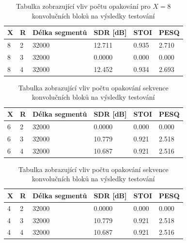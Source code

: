\begin{table}[hbt]
\centering
\caption{Tabulka zobrazující vliv počtu opakování pro $X=8$ konvolučních bloků na výsledky testování}
\label{tab:vliv-X8}
\begin{tabular}{|l|l|l|l|l|l|}
\hline
\textbf{X} & \textbf{R} & \textbf{Délka segmentů} & \textbf{SDR {[}dB{]}} & \textbf{STOI} & \textbf{PESQ} \\ \hline
8 & 2 & 32000 & 12.711 & 0.935 & 2.710 \\ \hline
8 & 3 & 32000 & 0.0000 & 0.000 & 0.000 \\ \hline
8 & 4 & 32000 & 12.452 & 0.934 & 2.693 \\ \hline
\end{tabular}
\end{table}


\begin{table}[hbt]
\centering
\caption{Tabulka zobrazující vliv počtu opakování sekvence konvolučních bloků na výsledky testování}
\label{tab:vliv-X6}
\begin{tabular}{|l|l|l|l|l|l|}
\hline
\textbf{X} & \textbf{R} & \textbf{Délka segmentů} & \textbf{SDR {[}dB{]}} & \textbf{STOI} & \textbf{PESQ} \\ \hline
6 & 2 & 32000 & 0.0000 & 0.000 & 0.000 \\ \hline
6 & 3 & 32000 & 10.779 & 0.921 & 2.518 \\ \hline
6 & 4 & 32000 & 10.687 & 0.921 & 2.516 \\ \hline
\end{tabular}
\end{table}


\begin{table}[hbt]
\centering
\caption{Tabulka zobrazující vliv počtu opakování sekvence konvolučních bloků na výsledky testování}
\label{tab:vliv-X4}
\begin{tabular}{|l|l|l|l|l|l|}
\hline
\textbf{X} & \textbf{R} & \textbf{Délka segmentů} & \textbf{SDR {[}dB{]}} & \textbf{STOI} & \textbf{PESQ} \\ \hline
4 & 2 & 32000 & 0.0000 & 0.000 & 0.000 \\ \hline
4 & 3 & 32000 & 10.779 & 0.921 & 2.518 \\ \hline
4 & 4 & 32000 & 10.687 & 0.921 & 2.516 \\ \hline
\end{tabular}
\end{table}


